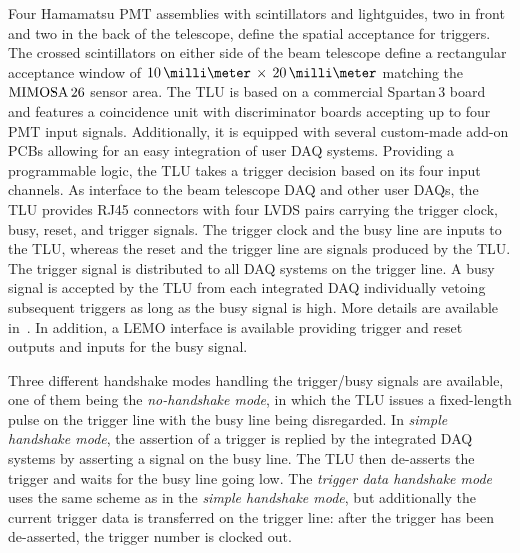 Four Hamamatsu PMT assemblies with scintillators and lightguides, two in front and two in the back of the telescope, define the spatial acceptance for triggers. 
The crossed scintillators on either side of the beam telescope define a rectangular acceptance window of $10\,\milli\meter\,\times\,20\,\milli\meter$ matching the $\textrm{MIMOSA\,26}$ sensor area. 
The TLU is based on a commercial Spartan\,3 board and features a coincidence unit with discriminator boards accepting up to four PMT input signals. 
Additionally, it is equipped with several custom-made add-on PCBs allowing for an easy integration of user DAQ systems. 
Providing a programmable logic, the TLU  takes a trigger decision based on its four input channels. 
As interface to the beam telescope DAQ and other user DAQs, the TLU provides RJ45 connectors with four LVDS pairs carrying the trigger clock, busy, reset, and trigger signals. 
The trigger clock and the busy line are inputs to the TLU, whereas the reset and the trigger line are signals produced by the TLU. 
The trigger signal is distributed to all DAQ systems on the trigger line. 
A busy signal is accepted by the TLU from each integrated DAQ individually vetoing subsequent triggers as long as the busy signal is high. 
More details are available in~\cite{EUDET-2009-04,ref:TLUproc}.
In addition, a LEMO interface is available providing trigger and reset outputs and inputs for the busy signal.

Three different handshake modes handling the trigger/busy signals are available, one of them being the \textit{no-handshake mode},
 in which the TLU issues a fixed-length pulse on the trigger line with the busy line being disregarded. 
In \textit{simple handshake mode}, the assertion of a trigger is replied by the integrated DAQ systems by asserting a signal on the busy line. 
The TLU then de-asserts the trigger and waits for the busy line going low.
The \textit{trigger data handshake mode} uses the same scheme as in the \textit{simple handshake mode}, but additionally the current trigger data is transferred on the trigger line:
after the trigger has been de-asserted, the trigger number is clocked out. 
%


